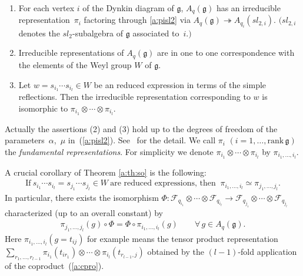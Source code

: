 \documentclass[pdftex]{sigma}
\begin{document}
\begin{theorem}[\cite{So2,VS}]\label{a:th:so}
\qquad
\begin{enumerate}\itemsep=0pt
\item[$(1)$]  For each vertex $i$
of the Dynkin diagram of $\mathfrak{g}$,
$A_q(\mathfrak{g})$ has an irreducible
representa\-tion~$\pi_i$ factoring through
\eqref{a:pisl2} via
$A_q(\mathfrak{g}) \twoheadrightarrow
A_{q_i}(sl_{2,i})$.
$(sl_{2,i}$ denotes the $sl_2$-subalgebra of $\mathfrak{g}$
asso\-ciated to~$i.)$

\item[$(2)$] Irreducible representations of $A_q(\mathfrak{g})$ are
in one to one correspondence with the elements of the Weyl group
$W$ of $\mathfrak{g}$.

\item[$(3)$] Let $w =s_{i_1}\cdots s_{i_l} \in W$ be an
reduced expression in terms of the simple reflections.
Then the irreducible representation corresponding to $w$ is
isomorphic to $\pi_{i_1}\otimes \cdots \otimes \pi_{i_l}$.
\end{enumerate}
\end{theorem}

Actually the assertions (2) and (3) hold
up to the degrees of freedom of the parame\-ters~$\alpha$,~$\mu$ in~(\ref{a:pisl2}).
See~\cite{So2} for the detail.
We call $\pi_i$ $(i = 1,\ldots, \mathrm{rank}\, \mathfrak{g})$
the {\em fundamental representations}.
For simplicity we denote
$\pi_{i_1} \otimes \cdots \otimes \pi_{i_l}$
by $\pi_{i_1,\ldots, i_l}$.

A crucial corollary of Theorem \ref{a:th:so} is the following:
\begin{gather*}
\mathrm{If } \ s_{i_1}\cdots s_{i_l} = s_{j_1}\cdots s_{j_l}
\in W \
\text{are reduced expressions, then } \
\pi_{i_1, \ldots, i_l} \simeq \pi_{j_1, \ldots, j_l}.
\end{gather*}
In particular, there exists the isomorphism
$\Phi: \mathcal{F}_{q_{i_1}}\otimes \cdots \otimes \mathcal{F}_{q_{i_l}}
\rightarrow
\mathcal{F}_{q_{j_1}}\otimes \cdots \otimes \mathcal{F}_{q_{j_l}}$
characterized (up to an overall constant) by
\begin{gather*}
\pi_{j_1, \ldots, j_l}(g)\circ \Phi = \Phi \circ \pi_{i_1, \ldots, i_l}(g)\qquad
\forall\, g \in A_q(\mathfrak{g}).
\end{gather*}
Here $\pi_{i_1, \ldots, i_l}(g=t_{ij})$ for example
means the tensor product representation
$\sum_{r_1,\ldots, r_{l-1}}
\pi_{i_1}(t_{i r_1}) \otimes \cdots \otimes \pi_{i_l}(t_{r_{l-1},j})$
obtained by the $(l-1)$-fold application of the
coproduct~(\ref{a:cpro}).
\end{document}

